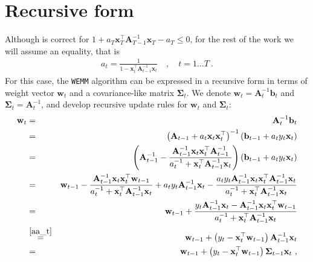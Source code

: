 \section{Recursive form}
\label{sec:WEMM_recursive}

Although  is correct for
$1+a_{T}\mathbf{x}_{T}^{\top}\mathbf{A}_{T-1}^{-1}\mathbf{x}_{T}-a_{T}\leq0$,
for the rest of the work we will assume an equality, that is
\begin{align}
a_{t}=\frac{1}{1-\mathbf{x}_{t}^{\top}\mathbf{A}_{t-1}^{-1}\mathbf{x}_{t}} \quad,\quad t=1 \dots T~.
\label{aa_t}
\end{align}
For this case, the \texttt{WEMM} algorithm can be expressed in a recursive form in terms of weight vector $\mathbf{w}_{t}$ and a covariance-like matrix $\mathbf{\Sigma}_{t}$. We denote $\mathbf{w}_{t}=\mathbf{A}_{t}^{-1}\mathbf{b}_{t}$ and $\mathbf{\Sigma}_{t}=\mathbf{A}_{t}^{-1}$, and develop recursive update rules for $\mathbf{w}_{t}$ and $\mathbf{\Sigma}_{t}$:
\begin{eqnarray}
\mathbf{w}_{t} & = & \mathbf{A}_{t}^{-1}\mathbf{b}_{t} \nonumber \\
 & = & \left(\mathbf{A}_{t-1}+a_{t}\mathbf{x}_{t}\mathbf{x}_{t}^{\top}\right)^{-1}\left(\mathbf{b}_{t-1}+a_{t}y_{t}\mathbf{x}_{t}\right) \nonumber \\
 & = & \left(\mathbf{A}_{t-1}^{-1}-\frac{\mathbf{A}_{t-1}^{-1}\mathbf{x}_{t}\mathbf{x}_{t}^{\top}\mathbf{A}_{t-1}^{-1}}{a_{t}^{-1}+\mathbf{x}_{t}^{\top}\mathbf{A}_{t-1}^{-1}\mathbf{x}_{t}}\right)\left(\mathbf{b}_{t-1}+a_{t}y_{t}\mathbf{x}_{t}\right) \nonumber \\
 & = & \mathbf{w}_{t-1}-\frac{\mathbf{A}_{t-1}^{-1}\mathbf{x}_{t}\mathbf{x}_{t}^{\top}\mathbf{w}_{t-1}}{a_{t}^{-1}+\mathbf{x}_{t}^{\top}\mathbf{A}_{t-1}^{-1}\mathbf{x}_{t}}+a_{t}y_{t}\mathbf{A}_{t-1}^{-1}\mathbf{x}_{t}-\frac{a_{t}y_{t}\mathbf{A}_{t-1}^{-1}\mathbf{x}_{t}\mathbf{x}_{t}^{\top}\mathbf{A}_{t-1}^{-1}\mathbf{x}_{t}}{a_{t}^{-1}+\mathbf{x}_{t}^{\top}\mathbf{A}_{t-1}^{-1}\mathbf{x}_{t}} \nonumber \\
 & = & \mathbf{w}_{t-1}+\frac{y_{t}\mathbf{A}_{t-1}^{-1}\mathbf{x}_{t}-\mathbf{A}_{t-1}^{-1}\mathbf{x}_{t}\mathbf{x}_{t}^{\top}\mathbf{w}_{t-1}}{a_{t}^{-1}+\mathbf{x}_{t}^{\top}\mathbf{A}_{t-1}^{-1}\mathbf{x}_{t}} \nonumber \\
 & \overset{\eqref{aa_t}}{=} & \mathbf{w}_{t-1}+\left(y_{t}-\mathbf{x}_{t}^{\top}\mathbf{w}_{t-1}\right)\mathbf{A}_{t-1}^{-1}\mathbf{x}_{t} \nonumber \\
 & = & \mathbf{w}_{t-1}+\left(y_{t}-\mathbf{x}_{t}^{\top}\mathbf{w}_{t-1}\right)\mathbf{\Sigma}_{t-1}\mathbf{x}_{t}~, \label{w_t}
\end{eqnarray}
